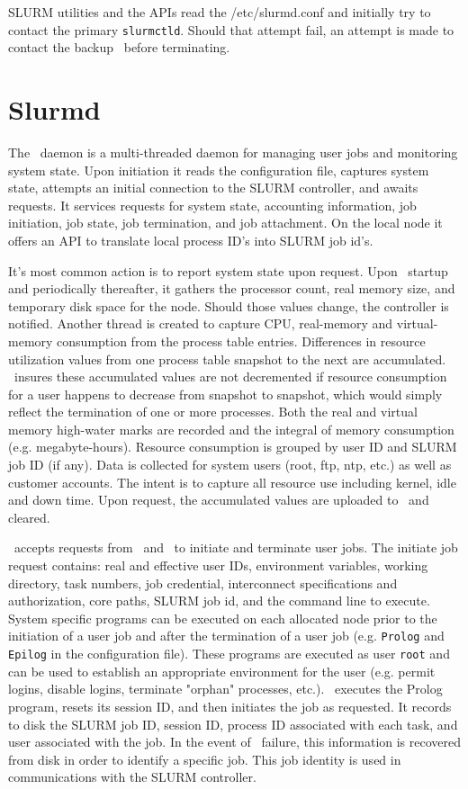 SLURM utilities and the APIs read the /etc/slurmd.conf 
and initially try to contact the primary {\tt slurmctld}. 
Should that attempt fail, an attempt is made to contact the 
backup \slurmctld\ before terminating.

\section{Slurmd}

The \slurmd\ daemon is a multi-threaded daemon for managing
user jobs and monitoring system state.  Upon initiation it reads
the configuration file, captures system state, attempts an initial
connection to the SLURM controller, and awaits requests.
It services requests for system state, accounting information,
job initiation, job state, job termination, and job attachment. On the
local node it offers an API to translate local process ID's into
SLURM job id's. 

It's most common action is to report system state upon request. Upon
\slurmd\ startup and periodically thereafter, it gathers the processor
count, real memory size, and temporary disk space for the node. Should
those values change, the controller is notified.  Another thread is
created to capture CPU, real-memory and virtual-memory consumption from
the process table entries.  Differences in resource utilization values
from one process table snapshot to the next are accumulated. \slurmd\ 
insures these accumulated values are not decremented if resource
consumption for a user happens to decrease from snapshot to snapshot,
which would simply reflect the termination of one or more processes.
Both the real and virtual memory high-water marks are recorded and
the integral of memory consumption (e.g. megabyte-hours).  Resource
consumption is grouped by user ID and SLURM job ID (if any). Data
is collected for system users (root, ftp, ntp, etc.) as well as
customer accounts. The intent is to capture all resource use including
kernel, idle and down time.  Upon request, the accumulated values are
uploaded to \slurmctld\ and cleared.  

\slurmd\ accepts requests from \srun\ and \slurmctld\ to initiate
and terminate user jobs. The initiate job request contains: 
real and effective user IDs, environment variables, working directory, task
numbers, job credential, interconnect specifications and authorization,
core paths, SLURM job id, and the command line to execute. 
System specific programs can be executed on each allocated 
node prior to the initiation of a user job and after the termination of a 
user job (e.g. {\tt Prolog} and {\tt Epilog} in the configuration file).
These programs are executed as user {\tt root} and can be used to establish
an appropriate environment for the user (e.g. permit logins, disable
logins, terminate "orphan" processes, etc.).  
\slurmd\ executes the Prolog program, resets its
session ID, and then initiates the job as requested. It records to
disk the SLURM job ID, session ID, process ID associated with each task,
and user associated with the job.  In the event of \slurmd\ failure,
this information is recovered from disk in order to identify a
specific job. This  job identity is used in communications with
the SLURM controller.

